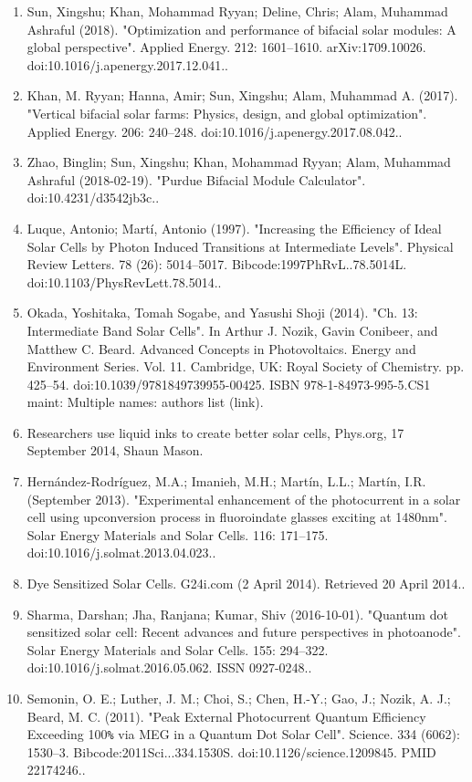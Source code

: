\begin{enumerate}
\item Sun, Xingshu; Khan, Mohammad Ryyan; Deline, Chris; Alam, Muhammad Ashraful (2018). "Optimization and performance of bifacial solar modules: A global perspective". Applied Energy. 212: 1601–1610. arXiv:1709.10026. doi:10.1016/j.apenergy.2017.12.041..
\item Khan, M. Ryyan; Hanna, Amir; Sun, Xingshu; Alam, Muhammad A. (2017). "Vertical bifacial solar farms: Physics, design, and global optimization". Applied Energy. 206: 240–248. doi:10.1016/j.apenergy.2017.08.042..
\item Zhao, Binglin; Sun, Xingshu; Khan, Mohammad Ryyan; Alam, Muhammad Ashraful (2018-02-19). "Purdue Bifacial Module Calculator". doi:10.4231/d3542jb3c..
\item Luque, Antonio; Martí, Antonio (1997). "Increasing the Efficiency of Ideal Solar Cells by Photon Induced Transitions at Intermediate Levels". Physical Review Letters. 78 (26): 5014–5017. Bibcode:1997PhRvL..78.5014L. doi:10.1103/PhysRevLett.78.5014..
\item Okada, Yoshitaka, Tomah Sogabe, and Yasushi Shoji (2014). "Ch. 13: Intermediate Band Solar Cells". In Arthur J. Nozik, Gavin Conibeer, and Matthew C. Beard. Advanced Concepts in Photovoltaics. Energy and Environment Series. Vol. 11. Cambridge, UK: Royal Society of Chemistry. pp. 425–54. doi:10.1039/9781849739955-00425. ISBN 978-1-84973-995-5.CS1 maint: Multiple names: authors list (link).
\item Researchers use liquid inks to create better solar cells, Phys.org, 17 September 2014, Shaun Mason.
\item Hernández-Rodríguez, M.A.; Imanieh, M.H.; Martín, L.L.; Martín, I.R. (September 2013). "Experimental enhancement of the photocurrent in a solar cell using upconversion process in fluoroindate glasses exciting at 1480nm". Solar Energy Materials and Solar Cells. 116: 171–175. doi:10.1016/j.solmat.2013.04.023..
\item Dye Sensitized Solar Cells. G24i.com (2 April 2014). Retrieved 20 April 2014..
\item Sharma, Darshan; Jha, Ranjana; Kumar, Shiv (2016-10-01). "Quantum dot sensitized solar cell: Recent advances and future perspectives in photoanode". Solar Energy Materials and Solar Cells. 155: 294–322. doi:10.1016/j.solmat.2016.05.062. ISSN 0927-0248..
\item Semonin, O. E.; Luther, J. M.; Choi, S.; Chen, H.-Y.; Gao, J.; Nozik, A. J.; Beard, M. C. (2011). "Peak External Photocurrent Quantum Efficiency Exceeding 100\verb|%| via MEG in a Quantum Dot Solar Cell". Science. 334 (6062): 1530–3. Bibcode:2011Sci...334.1530S. doi:10.1126/science.1209845. PMID 22174246..

\end{enumerate}
